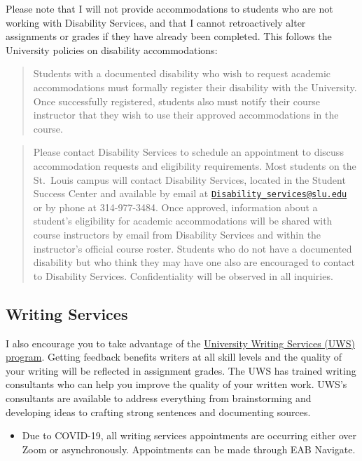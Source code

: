 \documentclass[
]{book}
\newenvironment{rmdblock}[1]
  {\begin{shaded*}
  \begin{itemize}
  \renewcommand{\labelitemi}{
    \raisebox{-.7\height}[0pt][0pt]{
      {\setkeys{Gin}{width=3em,keepaspectratio}\texttt{[image: images/\#1]}}
    }
  }
  \item
  }
  {
  \end{itemize}
  \end{shaded*}
  }
\newenvironment{rmdnote}
  {\begin{rmdblock}{note}}
  {\end{rmdblock}}
\begin{document}
Please note that I will not provide accommodations to students who are not working with Disability Services, and that I cannot retroactively alter assignments or grades if they have already been completed. This follows the University policies on disability accommodations:

\begin{quote}
Students with a documented disability who wish to request academic accommodations must formally register their disability with the University. Once successfully registered, students also must notify their course instructor that they wish to use their approved accommodations in the course.
\end{quote}

\begin{quote}
Please contact Disability Services to schedule an appointment to discuss accommodation requests and eligibility requirements. Most students on the St.~Louis campus will contact Disability Services, located in the Student Success Center and available by email at \href{mailto:Disability_services@slu.edu}{\nolinkurl{Disability\_services@slu.edu}} or by phone at 314-977-3484. Once approved, information about a student's eligibility for academic accommodations will be shared with course instructors by email from Disability Services and within the instructor's official course roster. Students who do not have a documented disability but who think they may have one also are encouraged to contact to Disability Services. Confidentiality will be observed in all inquiries.
\end{quote}

\hypertarget{writing-services}{%
\subsection{Writing Services}\label{writing-services}}

I also encourage you to take advantage of the \href{https://www.slu.edu/life-at-slu/student-success-center/academic-support/university-writing-services/index.php}{University Writing Services (UWS) program}. Getting feedback benefits writers at all skill levels and the quality of your writing will be reflected in assignment grades. The UWS has trained writing consultants who can help you improve the quality of your written work. UWS's consultants are available to address everything from brainstorming and developing ideas to crafting strong sentences and documenting sources.

\begin{rmdnote}
Due to COVID-19, all writing services appointments are occurring either
over Zoom or asynchronously. Appointments can be made through EAB
Navigate.
\end{rmdnote}
\end{document}
